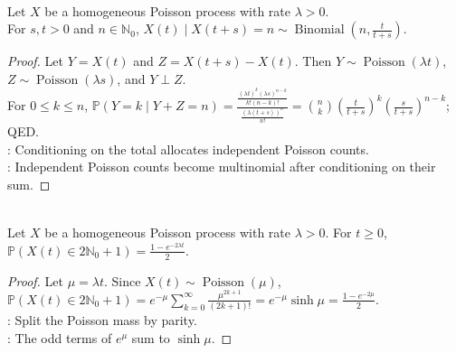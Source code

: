 \begin{proposition} \label{prop:poisson-conditional-binomial-count} \\
Let $X$ be a homogeneous Poisson process with rate $\lambda>0$.\\
For $s,t>0$ and $n\in\mathbb{N}_0$, $X(t)\mid X(t+s)=n\sim\operatorname{Binomial}\left(n,\frac{t}{t+s}\right)$.
\begin{proof} Let $Y=X(t)$ and $Z=X(t+s)-X(t)$. Then $Y\sim\operatorname{Poisson}(\lambda t)$, $Z\sim\operatorname{Poisson}(\lambda s)$, and $Y\perp Z$.\\
For $0\leq k\leq n$, $\mathbb{P}(Y=k\mid Y+Z=n)=\frac{\frac{(\lambda t)^k(\lambda s)^{n-k}}{k!(n-k)!}}{\frac{(\lambda(t+s))^n}{n!}}=\binom{n}{k}\left(\frac{t}{t+s}\right)^k\left(\frac{s}{t+s}\right)^{n-k}$; QED.\\
: Conditioning on the total allocates independent Poisson counts.\\
: Independent Poisson counts become multinomial after conditioning on their sum.
\end{proof}
\end{proposition}

\begin{proposition} \label{prop:poisson-odd-count-probability} \\
Let $X$ be a homogeneous Poisson process with rate $\lambda>0$. For $t\geq0$, $\mathbb{P}(X(t)\in2\mathbb{N}_0+1)=\frac{1-e^{-2\lambda t}}{2}$.
\begin{proof} Let $\mu=\lambda t$. Since $X(t)\sim\operatorname{Poisson}(\mu)$, $\mathbb{P}(X(t)\in2\mathbb{N}_0+1)=e^{-\mu}\sum\limits_{k=0}^{\infty}\frac{\mu^{2k+1}}{(2k+1)!}=e^{-\mu}\sinh\mu=\frac{1-e^{-2\mu}}{2}$.\\
: Split the Poisson mass by parity.\\
: The odd terms of $e^{\mu}$ sum to $\sinh\mu$.
\end{proof}
\end{proposition}

